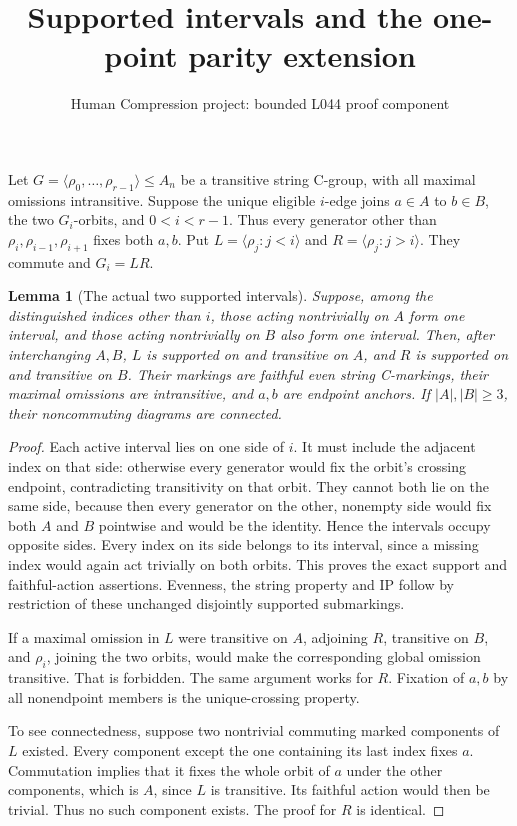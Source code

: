 \documentclass[11pt,a4paper]{article}
\title{Supported intervals and the one-point parity extension}
\author{Human Compression project: bounded L044 proof component}
\date{}
\newtheorem{lemma}{Lemma}
\newcommand{\gen}[1]{\langle#1\rangle}
\begin{document}
\maketitle
Let $G=\gen{\rho_0,\ldots,\rho_{r-1}}\leq A_n$ be a
transitive string C-group, with all maximal omissions intransitive.
Suppose the unique eligible $i$-edge joins $a\in A$ to $b\in B$,
the two $G_i$-orbits, and $0<i<r-1$. Thus every generator
other than $\rho_i,\rho_{i-1},\rho_{i+1}$ fixes both $a,b$.
Put $L=\gen{\rho_j:j<i}$ and $R=\gen{\rho_j:j>i}$.
They commute and $G_i=LR$.

\begin{lemma}[The actual two supported intervals]
Suppose, among the distinguished indices other than $i$, those
acting nontrivially on $A$ form one interval,
and those acting nontrivially on $B$ also form one interval.
Then, after interchanging $A,B$, $L$ is supported on and
transitive on $A$, and $R$ is supported on and transitive on $B$.
Their markings are faithful even string C-markings, their
maximal omissions are intransitive, and $a,b$ are endpoint anchors.
If $|A|,|B|\geq3$, their noncommuting diagrams are connected.
\end{lemma}
\begin{proof}
Each active interval lies on one side of $i$. It must include
the adjacent index on that side: otherwise every generator
would fix the orbit's crossing endpoint, contradicting
transitivity on that orbit. They cannot both lie on the same
side, because then every generator on the other, nonempty
side would fix both $A$ and $B$ pointwise and would be the
identity. Hence the intervals occupy opposite sides. Every
index on its side belongs to its interval, since a missing
index would again act trivially on both orbits.
This proves the exact support and faithful-action assertions.
Evenness, the string property and IP follow by restriction
of these unchanged disjointly supported submarkings.

If a maximal omission in $L$ were transitive on $A$, adjoining
$R$, transitive on $B$, and $\rho_i$, joining the two orbits,
would make the corresponding global omission transitive.
That is forbidden. The same argument works for $R$.
Fixation of $a,b$ by all nonendpoint members is the
unique-crossing property.

To see connectedness, suppose two nontrivial commuting marked
components of $L$ existed. Every component except the one
containing its last index fixes $a$. Commutation implies that
it fixes the whole orbit of $a$ under the other components,
which is $A$, since $L$ is transitive. Its faithful action would
then be trivial. Thus no such component exists. The proof for
$R$ is identical.
\end{proof}
\end{document}

